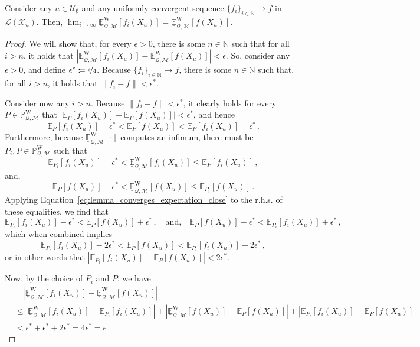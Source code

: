 \documentclass[twoside,11pt]{article}
\newcommand{\nats}{\mathbb{N}}
\newcommand{\states}{\mathcal{X}}
\newcommand{\processes}{\mathbb{P}}
\newcommand{\wprocesses}{\processes^{\mathrm{W}}}
\newcommand{\lexp}{\underline{\mathbb{E}}_{\rateset,\mathcal{M}}^\mathrm{W}}
\newcommand{\gambles}{\mathcal{L}}
\newcommand{\rateset}{\mathcal{Q}}
\newcommand{\norm}[1]{\left\lVert #1 \right\rVert}
\newcommand{\abs}[1]{\left\vert #1 \right\vert}
\newcommand{\coloneqq}{:\!=}
\begin{document}
\begin{lemma}\label{lemma:limit_lexp_is_lexp_limit}
Consider any $u\in\mathcal{U}_\emptyset$ and any uniformly convergent sequence $\{f_i\}_{i\in\nats}\to f$ in $\gambles(\states_u)$. Then, $\lim_{i\to\infty}\lexp[f_i(X_u)]=\lexp[f(X_u)]$.
\end{lemma}
\begin{proof}
We will show that, for every $\epsilon>0$, there is some $n\in\nats$ such that for all $i>n$, it holds that $\abs{\lexp[f_i(X_u)]-\lexp[f(X_u)]} < \epsilon$. So, consider any $\epsilon>0$, and define $\epsilon^*\coloneqq \nicefrac{\epsilon}{4}$. Because $\{f_i\}_{i\in\nats}\to f$, there is some $n\in\nats$ such that, for all $i>n$, it holds that $\norm{f_i - f}<\epsilon^*$. 

Consider now any $i>n$. Because $\norm{f_i - f}<\epsilon^*$, it clearly holds for every $P\in\wprocesses_{\rateset,\mathcal{M}}$ that $\abs{\mathbb{E}_P[f_i(X_u)] - \mathbb{E}_P[f(X_u)]}<\epsilon^*$, and hence
\begin{equation}\label{eq:lemma_converges_expectation_close}
\mathbb{E}_P[f_i(X_u)] - \epsilon^* < \mathbb{E}_P[f(X_u)] < \mathbb{E}_P[f_i(X_u)] + \epsilon^*\,.
\end{equation}
Furthermore, because $\lexp[\cdot]$ computes an infimum, there must be $P_i,P\in\wprocesses_{\rateset,\mathcal{M}}$ such that
\begin{equation*}
\mathbb{E}_{P_i}[f_i(X_u)] - \epsilon^* < \lexp[f_i(X_u)] \leq \mathbb{E}_{P}[f_i(X_u)]\,,
\end{equation*}
and,
\begin{equation*}
\mathbb{E}_{P}[f(X_u)] - \epsilon^* < \lexp[f(X_u)] \leq \mathbb{E}_{P_i}[f(X_u)]\,.
\end{equation*}
Applying Equation~\eqref{eq:lemma_converges_expectation_close} to the r.h.s. of these equalities, we find that
\begin{equation*}
\mathbb{E}_{P_i}[f_i(X_u)] - \epsilon^* < \mathbb{E}_{P}[f(X_u)] + \epsilon^*\,,\quad\text{and,}\quad \mathbb{E}_{P}[f(X_u)] - \epsilon^* < \mathbb{E}_{P_i}[f_i(X_u)] + \epsilon^*\,,
\end{equation*}
which when combined implies
\begin{equation*}
\mathbb{E}_{P_i}[f_i(X_u)] - 2\epsilon^* < \mathbb{E}_{P}[f(X_u)] < \mathbb{E}_{P_i}[f_i(X_u)] + 2\epsilon^*\,,
\end{equation*}
or in other words that $\abs{\mathbb{E}_{P_i}[f_i(X_u)] - \mathbb{E}_{P}[f(X_u)]} < 2\epsilon^*$.

Now, by the choice of $P_i$ and $P$, we have
\begin{align*}
 &\quad \abs{\lexp[f_i(X_u)]-\lexp[f(X_u)]} \\
 &\leq \abs{\lexp[f_i(X_u)] - \mathbb{E}_{P_i}[f_i(X_u)]} + \abs{\lexp[f(X_u)] - \mathbb{E}_{P}[f(X_u)]} + \abs{\mathbb{E}_{P_i}[f_i(X_u)] - \mathbb{E}_{P}[f(X_u)]} \\
 &< \epsilon^* + \epsilon^* + 2\epsilon^* = 4\epsilon^* = \epsilon\,.
\end{align*}
\end{proof}
\end{document}
